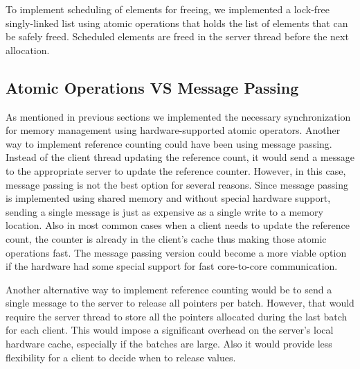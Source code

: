 To implement scheduling of elements for freeing, we implemented a lock-free singly-linked list using atomic operations that holds 
the list of elements that can be safely freed. Scheduled elements are freed in the server thread before the next allocation.

\subsection{Atomic Operations VS Message Passing}

As mentioned in previous sections we implemented the necessary synchronization for memory management using hardware-supported atomic 
operators. Another way to implement reference counting could have been using message passing. Instead of the client thread 
updating the reference count, it would send a message to the appropriate server to update the reference counter. However, in this 
case, message passing is not the best option for several reasons. Since message passing is implemented 
using shared memory and without special hardware support, sending a single message is just as expensive as a single write 
to a memory location. Also in most common cases when a client needs to update the reference count, the counter is already in 
the client's cache thus making those atomic operations fast. The message passing version could become a more viable option 
if the hardware had some special support for fast core-to-core communication.

Another alternative way to implement reference counting would be to send a single message to the server to release all pointers 
per batch. However, that would require the server thread to store all the pointers allocated during the last batch for each client. 
This would impose a significant overhead on the server's local hardware cache, especially if the batches are large. Also it would provide less 
flexibility for a client to decide when to release values.
